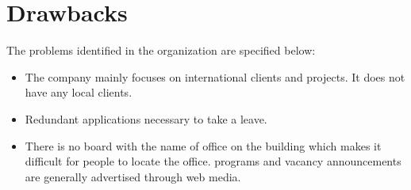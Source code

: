 \section{Drawbacks}
The problems identified in the organization are specified below:
\begin{itemize}
\item The company mainly focuses on international clients and projects. It does not have any local clients.
\item Redundant applications necessary to take a leave.
\item There is no board with the name of office on the building which makes it difficult for people to locate
the office.
\itemInternship programs and vacancy announcements are generally advertised through web media.
\end{itemize}
\cleardoublepage
